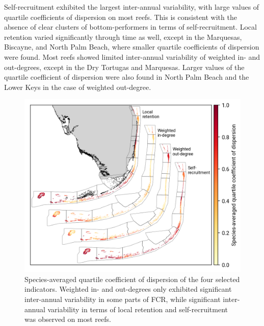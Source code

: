 \documentclass[preprint,12pt,authoryear]{elsarticle}
\begin{document}
Self-recruitment exhibited the largest inter-annual variability, with large values of quartile coefficients of dispersion on most reefs. This is consistent with the absence of clear clusters of bottom-performers in terms of self-recruitment. Local retention varied significantly through time as well, except in the Marquesas, Biscayne, and North Palm Beach, where smaller quartile coefficients of dispersion were found. Most reefs showed limited inter-annual variability of weighted in- and out-degrees, except in the Dry Tortugas and Marquesas. Larger values of the quartile coefficient of dispersion were also found in North Palm Beach and the Lower Keys in the case of weighted out-degree.
\begin{figure}
    \centering
    \includegraphics[width=\textwidth]{figures/species_averaged_quartile_coefficient_of_dispersion.png}
    \caption{Species-averaged quartile coefficient of dispersion of the four selected indicators. Weighted in- and out-degrees only exhibited significant inter-annual variability in some parts of FCR, while significant inter-annual variability in terms of local retention and self-recruitment was observed on most reefs.}\label{fig:variability}
\end{figure}
\end{document}
